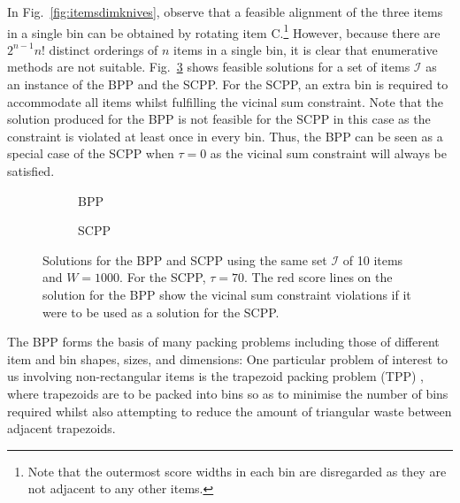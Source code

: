 \documentclass[a4paper,11pt,authoryear]{elsarticle}
\begin{document}

In Fig.~\ref{fig:itemsdimknives}, observe that a feasible alignment of the three items in a single bin can be obtained by rotating item C.\footnote{Note that the outermost score widths in each bin are disregarded as they are not adjacent to any other items.} However, because there are $2^{n-1} n!$ distinct orderings of $n$ items in a single bin, it is clear that enumerative methods are not suitable. Fig.~\ref{fig:bppvscpp} shows feasible solutions for a set of items $\mathcal{I}$ as an instance of the BPP and the SCPP. For the SCPP, an extra bin is required to accommodate all items whilst fulfilling the vicinal sum constraint. Note that the solution produced for the BPP is not feasible for the SCPP in this case as the constraint is violated at least once in every bin. Thus, the BPP can be seen as a special case of the SCPP when $\tau=0$ as the vicinal sum constraint will always be satisfied.

\begin{figure}[H]
	\centering	
	\begin{subfigure}[h]{0.42\textwidth}
		
		\caption{BPP}
		\label{fig:bpp}
	\end{subfigure} \hspace{10mm}
	\begin{subfigure}[h]{0.42\textwidth}
		
		\caption{SCPP}
		\label{fig:scpp}
	\end{subfigure}
	\caption{Solutions for the BPP and SCPP using the same set $\mathcal{I}$ of 10 items and $W = 1000$. For the SCPP, $\tau = 70$. The red score lines on the solution for the BPP show the vicinal sum constraint violations if it were to be used as a solution for the SCPP.}	
	\label{fig:bppvscpp}
\end{figure}

\noindent The BPP forms the basis of many packing problems including those of different item and bin shapes, sizes, and dimensions:  One particular problem of interest to us involving non-rectangular items is the trapezoid packing problem (TPP) \citep{lewis2011, lewis2017}, where trapezoids are to be packed into bins so as to minimise the number of bins required whilst also attempting to reduce the amount of triangular waste between adjacent trapezoids.
\end{document}
